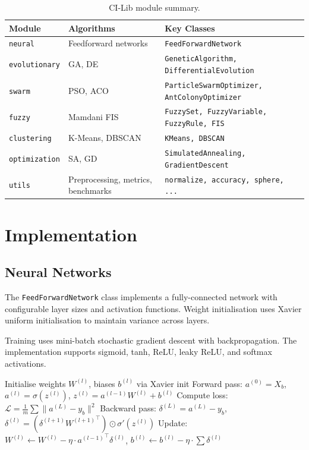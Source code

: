 \documentclass[12pt,a4paper,twoside]{report}
\begin{document}
\begin{table}[h]
  \centering
  \begin{tabular}{lll}
    \toprule
    Module & Algorithms & Key Classes \\
    \midrule
    \texttt{neural} & Feedforward networks & \texttt{FeedForwardNetwork} \\
    \texttt{evolutionary} & GA, DE & \texttt{GeneticAlgorithm, DifferentialEvolution} \\
    \texttt{swarm} & PSO, ACO & \texttt{ParticleSwarmOptimizer, AntColonyOptimizer} \\
    \texttt{fuzzy} & Mamdani FIS & \texttt{FuzzySet, FuzzyVariable, FuzzyRule, FIS} \\
    \texttt{clustering} & K-Means, DBSCAN & \texttt{KMeans, DBSCAN} \\
    \texttt{optimization} & SA, GD & \texttt{SimulatedAnnealing, GradientDescent} \\
    \texttt{utils} & Preprocessing, metrics, benchmarks & \texttt{normalize, accuracy, sphere, ...} \\
    \bottomrule
  \end{tabular}
  \caption{CI-Lib module summary.}
  \label{tab:modules}
\end{table}


\chapter{Implementation}
\label{chap:implementation}

\section{Neural Networks}
The \texttt{FeedForwardNetwork} class implements a fully-connected network
with configurable layer sizes and activation functions. Weight initialisation
uses Xavier uniform initialisation \citep{glorot2010difficulty} to maintain
variance across layers.

Training uses mini-batch stochastic gradient descent with backpropagation.
The implementation supports sigmoid, tanh, ReLU, leaky ReLU, and softmax
activations.

\begin{algorithm}[h]
  \caption{Feedforward Network Training}\label{alg:nn}
  \begin{algorithmic}[1]
    \State Initialise weights $W^{(l)}$, biases $b^{(l)}$ via Xavier init
        \State Forward pass: $a^{(0)} = X_b$, $a^{(l)} = \sigma(z^{(l)})$,
              $z^{(l)} = a^{(l-1)}W^{(l)} + b^{(l)}$
        \State Compute loss: $\mathcal{L} = \frac{1}{m}\sum\|a^{(L)} - y_b\|^2$
        \State Backward pass: $\delta^{(L)} = a^{(L)} - y_b$,
              $\delta^{(l)} = (\delta^{(l+1)}{W^{(l+1)}}^\top) \odot \sigma'(z^{(l)})$
        \State Update: $W^{(l)} \gets W^{(l)} - \eta \cdot {a^{(l-1)}}^\top \delta^{(l)}$,
              $b^{(l)} \gets b^{(l)} - \eta \cdot \sum \delta^{(l)}$
      \EndFor
    \EndFor
  \end{algorithmic}
\end{algorithm}
\end{document}
